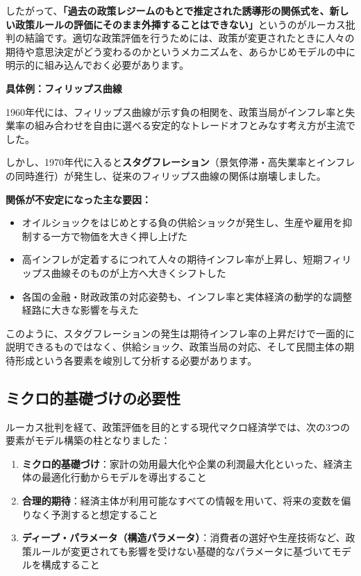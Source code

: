 \documentclass[
  japanese,
  lualatex,
  ja=standard,
  12pt,
  a4paper]{ltjsarticle}
\providecommand{\tightlist}{%
  \setlength{\itemsep}{0pt}\setlength{\parskip}{0pt}}
\begin{document}
したがって、\textbf{「過去の政策レジームのもとで推定された誘導形の関係式を、新しい政策ルールの評価にそのまま外挿することはできない」}というのがルーカス批判の結論です。適切な政策評価を行うためには、政策が変更されたときに人々の期待や意思決定がどう変わるのかというメカニズムを、あらかじめモデルの中に明示的に組み込んでおく必要があります。

\textbf{具体例：フィリップス曲線}

1960年代には、フィリップス曲線が示す負の相関を、政策当局がインフレ率と失業率の組み合わせを自由に選べる安定的なトレードオフとみなす考え方が主流でした。

しかし、1970年代に入ると\textbf{スタグフレーション}（景気停滞・高失業率とインフレの同時進行）が発生し、従来のフィリップス曲線の関係は崩壊しました。

\textbf{関係が不安定になった主な要因：}

\begin{itemize}
\tightlist
\item
  オイルショックをはじめとする負の供給ショックが発生し、生産や雇用を抑制する一方で物価を大きく押し上げた
\item
  高インフレが定着するにつれて人々の期待インフレ率が上昇し、短期フィリップス曲線そのものが上方へ大きくシフトした
\item
  各国の金融・財政政策の対応姿勢も、インフレ率と実体経済の動学的な調整経路に大きな影響を与えた
\end{itemize}

このように、スタグフレーションの発生は期待インフレ率の上昇だけで一面的に説明できるものではなく、供給ショック、政策当局の対応、そして民間主体の期待形成という各要素を峻別して分析する必要があります。

\subsection{ミクロ的基礎づけの必要性}\label{ux30dfux30afux30edux7684ux57faux790eux3065ux3051ux306eux5fc5ux8981ux6027}

ルーカス批判を経て、政策評価を目的とする現代マクロ経済学では、次の3つの要素がモデル構築の柱となりました：

\begin{enumerate}
\def\labelenumi{\arabic{enumi}.}
\tightlist
\item
  \textbf{ミクロ的基礎づけ}：家計の効用最大化や企業の利潤最大化といった、経済主体の最適化行動からモデルを導出すること
\item
  \textbf{合理的期待}：経済主体が利用可能なすべての情報を用いて、将来の変数を偏りなく予測すると想定すること
\item
  \textbf{ディープ・パラメータ（構造パラメータ）}：消費者の選好や生産技術など、政策ルールが変更されても影響を受けない基礎的なパラメータに基づいてモデルを構成すること
\end{enumerate}
\end{document}
